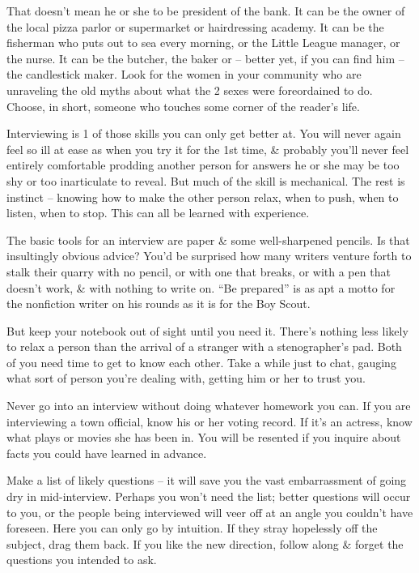 \documentclass{article}
\begin{document}
That doesn't mean he or she to be president of the bank. It can be the owner of the local pizza parlor or supermarket or hairdressing academy. It can be the fisherman who puts out to sea every morning, or the Little League manager, or the nurse. It can be the butcher, the baker or -- better yet, if you can find him -- the candlestick maker. Look for the women in your community who are unraveling the old myths about what the 2 sexes were foreordained to do. Choose, in short, someone who touches some corner of the reader's life.

Interviewing is 1 of those skills you can only get better at. You will never again feel so ill at ease as when you try it for the 1st time, \& probably you'll never feel entirely comfortable prodding another person for answers he or she may be too shy or too inarticulate to reveal. But much of the skill is mechanical. The rest is instinct -- knowing how to make the other person relax, when to push, when to listen, when to stop. This can all be learned with experience.

The basic tools for an interview are paper \& some well-sharpened pencils. Is that insultingly obvious advice? You'd be surprised how many writers venture forth to stalk their quarry with no pencil, or with one that breaks, or with a pen that doesn't work, \& with nothing to write on. ``Be prepared'' is as apt a motto for the nonfiction writer on his rounds as it is for the Boy Scout.

But keep your notebook out of sight until you need it. There's nothing less likely to relax a person than the arrival of a stranger with a stenographer's pad. Both of you need time to get to know each other. Take a while just to chat, gauging what sort of person you're dealing with, getting him or her to trust you.

Never go into an interview without doing whatever homework you can. If you are interviewing a town official, know his or her voting record. If it's an actress, know what plays or movies she has been in. You will be resented if you inquire about facts you could have learned in advance.

Make a list of likely questions -- it will save you the vast embarrassment of going dry in mid-interview. Perhaps you won't need the list; better questions will occur to you, or the people being interviewed will veer off at an angle you couldn't have foreseen. Here you can only go by intuition. If they stray hopelessly off the subject, drag them back. If you like the new direction, follow along \& forget the questions you intended to ask.
\end{document}
